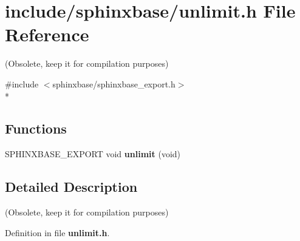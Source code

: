 \section{include/sphinxbase/unlimit.h File Reference}
\label{unlimit_8h}


(Obsolete, keep it for compilation purposes)  


{\ttfamily \#include $<$sphinxbase/sphinxbase\-\_\-export.\-h$>$}\\*
\subsection*{Functions}
\begin{DoxyCompactItemize}
\item 
S\-P\-H\-I\-N\-X\-B\-A\-S\-E\-\_\-\-E\-X\-P\-O\-R\-T void {\bfseries unlimit} (void)\label{unlimit_8h_a0b8bf51305f48eb78ff53ebb8ad27248}

\end{DoxyCompactItemize}


\subsection{Detailed Description}
(Obsolete, keep it for compilation purposes) 

Definition in file {\bf unlimit.\-h}.

